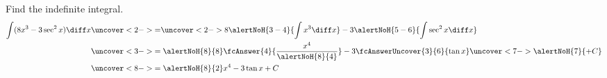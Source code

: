 \begin{frame}
\begin{example}
Find the indefinite integral.
\abovedisplayskip=0pt
\belowdisplayskip=0pt
\abovedisplayshortskip=0pt
\belowdisplayshortskip=0pt
\begin{align*}
\int (8x^3 - 3\sec^2 x )\diff x %
& \uncover<2->{=}  \uncover<2->{8\alertNoH{ 3-4}{\int x^3 \diff x} - 3 \alertNoH{ 5-6}{\int \sec^2 x \diff x}}\\
& \uncover<3->{= \alertNoH{8}{ 8} \fcAnswer{4}{\frac{x^4}{\alertNoH{8}{4}}} - 3 \fcAnswerUncover{3}{ 6}{\tan x}} \uncover<7->{\alertNoH{ 7}{+C}}\\
& \uncover<8->{=\alertNoH{8}{2} x^4 - 3 \tan x + C}
\end{align*}
\end{example}
\end{frame}

